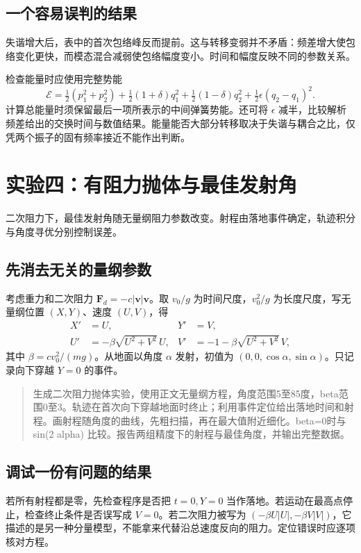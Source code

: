 \documentclass[11pt,openany,fontset=fandol]{ctexbook}
\theoremstyle{plain}\newtheorem{theorem}{定理}[chapter]\newtheorem{proposition}[theorem]{命题}
\theoremstyle{definition}\newtheorem{definition}{定义}[chapter]\newtheorem{example}{例}[chapter]
\theoremstyle{remark}\newtheorem*{remark}{说明}
\newcommand{\vct}[1]{\bm{#1}}\newcommand{\Rea}{\operatorname{Re}}\newcommand{\Ima}{\operatorname{Im}}
\begin{document}
\subsection{一个容易误判的结果}
失谐增大后，表中的首次包络峰反而提前。这与转移变弱并不矛盾：频差增大使包络变化更快，而模态混合减弱使包络幅度变小。时间和幅度反映不同的参数关系。

检查能量时应使用完整势能
\[
\mathcal E=\tfrac12(p_1^2+p_2^2)+\tfrac12(1+\delta)q_1^2+
\tfrac12(1-\delta)q_2^2+\tfrac12\epsilon(q_2-q_1)^2.
\]
计算总能量时须保留最后一项所表示的中间弹簧势能。还可将 $\epsilon$ 减半，比较解析频差给出的交换时间与数值结果。能量能否大部分转移取决于失谐与耦合之比，仅凭两个振子的固有频率接近不能作出判断。

\section{实验四：有阻力抛体与最佳发射角}
二次阻力下，最佳发射角随无量纲阻力参数改变。射程由落地事件确定，轨迹积分与角度寻优分别控制误差。

\subsection{先消去无关的量纲参数}
考虑重力和二次阻力 $\vct F_d=-c|\vct v|\vct v$。取 $v_0/g$ 为时间尺度，$v_0^2/g$ 为长度尺度，写无量纲位置 $(X,Y)$、速度 $(U,V)$，得
\begin{align}
X'&=U,&Y'&=V,\\
U'&=-\beta\sqrt{U^2+V^2}\,U,&V'&=-1-\beta\sqrt{U^2+V^2}\,V,
\end{align}
其中 $\beta=cv_0^2/(mg)$。从地面以角度 $\alpha$ 发射，初值为 $(0,0,\cos\alpha,\sin\alpha)$。只记录向下穿越 $Y=0$ 的事件。

\begin{quote}\small
生成二次阻力抛体实验，使用正文无量纲方程，角度范围5至85度，beta范围0至3。轨迹在首次向下穿越地面时终止；利用事件定位给出落地时间和射程。画射程随角度的曲线，先粗扫描，再在最大值附近细化。beta=0时与 sin(2 alpha) 比较。报告两组精度下的射程与最佳角度，并输出完整数据。
\end{quote}

\subsection{调试一份有问题的结果}
若所有射程都是零，先检查程序是否把 $t=0,Y=0$ 当作落地。若运动在最高点停止，检查终止条件是否误写成 $V=0$。若二次阻力被写为 $(-\beta U|U|,-\beta V|V|)$，它描述的是另一种分量模型，不能拿来代替沿总速度反向的阻力。定位错误时应逐项核对方程。
\end{document}
